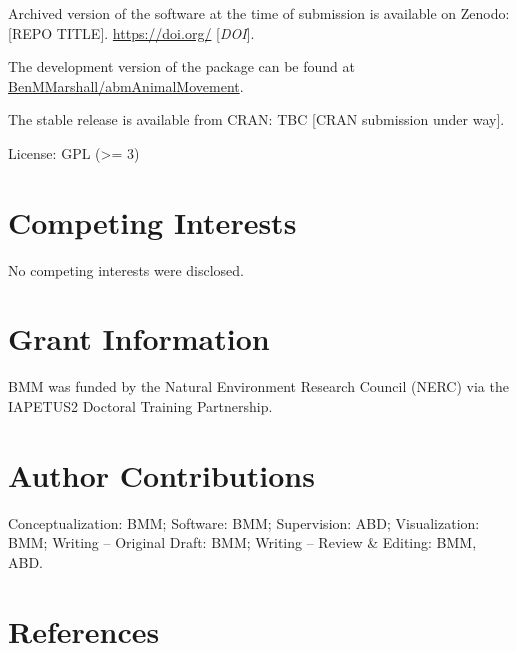 \documentclass[10pt,a4paper]{article}
\begin{document}
Archived version of the software at the time of submission is available on Zenodo: {[}REPO TITLE{]}. \url{https://doi.org/} {[}\emph{DOI}{]}.

The development version of the package can be found at \href{https://github.com/BenMMarshall/abmAnimalMovement}{BenMMarshall/abmAnimalMovement}.

The stable release is available from CRAN: TBC {[}CRAN submission under way{]}.

License: GPL (\textgreater= 3)

\hypertarget{competing-interests}{%
\section{Competing Interests}\label{competing-interests}}

No competing interests were disclosed.

\hypertarget{grant-information}{%
\section{Grant Information}\label{grant-information}}

BMM was funded by the Natural Environment Research Council (NERC) via the IAPETUS2 Doctoral Training Partnership.

\hypertarget{author-contributions}{%
\section{Author Contributions}\label{author-contributions}}

Conceptualization: BMM;
Software: BMM;
Supervision: ABD;
Visualization: BMM;
Writing -- Original Draft: BMM;
Writing -- Review \& Editing: BMM, ABD.

\clearpage

\hypertarget{references}{%
\section*{References}\label{references}}
\end{document}
